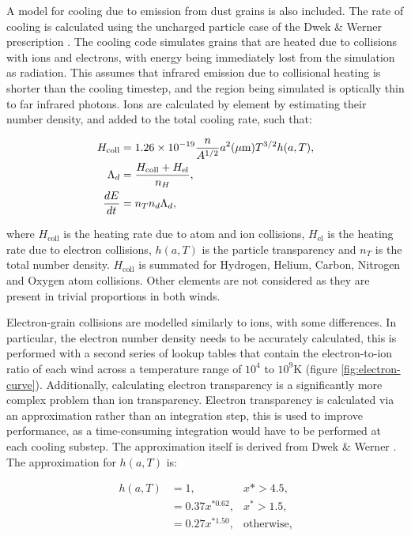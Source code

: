 A model for cooling due to emission from dust grains is also included. The rate of cooling is calculated using the uncharged particle case of the Dwek \& Werner prescription \cite{dwek_infrared_1981}. The cooling code simulates grains that are heated due to collisions with ions and electrons, with energy being immediately lost from the simulation as radiation. This assumes that infrared emission due to collisional heating is shorter than the cooling timestep, and the region being simulated is optically thin to far infrared photons. Ions are calculated by element by estimating their number density, and added to the total cooling rate, such that:

\begin{subequations}
  \begin{align}
    H_\text{coll} & = 1.26 \times 10^{-19} \frac{n}{A^{1/2}} a^2(\mu \text m) T^{3/2} h(a,T) , \\
        \Lambda_d & = \frac{H_\text{coll} + H_\text{el}}{n_H} , \\
    \frac{dE}{dt} & = n_T n_d \Lambda_d ,
  \end{align}
\end{subequations}

where $H_\text{coll}$ is the heating rate due to atom and ion collisions, $H_\text{el}$ is the heating rate due to electron collisions, $h(a,T)$ is the particle transparency and $n_T$ is the total number density. $H_\text{coll}$ is summated for Hydrogen, Helium, Carbon, Nitrogen and Oxygen atom collisions. Other elements are not considered as they are present in trivial proportions in both winds.

Electron-grain collisions are modelled similarly to ions, with some differences. In particular, the electron number density needs to be accurately calculated, this is performed with a second series of lookup tables that contain the electron-to-ion ratio of each wind across a temperature range of $10^4$ to $10^9\si{\kelvin}$ (figure \ref{fig:electron-curve}). Additionally, calculating electron transparency is a significantly more complex problem than ion transparency. Electron transparency is calculated via an approximation rather than an integration step, this is used to improve performance, as a time-consuming integration would have to be performed at each cooling substep. The approximation itself is derived from Dwek \& Werner \cite{dwek_infrared_1981}. The approximation for $h(a,T)$ is:

\begin{subequations}
  \begin{align}
    h(a,T) & = 1,              & x* > 4.5 , \\
           & = 0.37x^{*0.62} , & x^* > 1.5 , \\
           & = 0.27x^{*1.50} , & \text{otherwise} ,
  \end{align}
\end{subequations}

